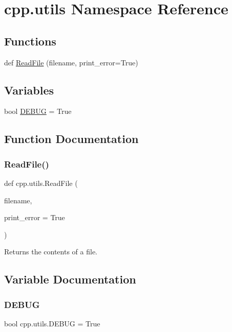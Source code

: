 \hypertarget{namespacecpp_1_1utils}{}\section{cpp.\+utils Namespace Reference}
\label{namespacecpp_1_1utils}
\subsection*{Functions}
\begin{DoxyCompactItemize}
\item 
def \mbox{\hyperlink{namespacecpp_1_1utils_a4258aa53673d101d6f57320ec9a3c3a2}{Read\+File}} (filename, print\+\_\+error=True)
\end{DoxyCompactItemize}
\subsection*{Variables}
\begin{DoxyCompactItemize}
\item 
bool \mbox{\hyperlink{namespacecpp_1_1utils_aa59cfd61e9b0495b717753e45fe9d201}{D\+E\+B\+UG}} = True
\end{DoxyCompactItemize}


\subsection{Function Documentation}
\mbox{\label{namespacecpp_1_1utils_a4258aa53673d101d6f57320ec9a3c3a2}} 
\subsubsection{\texorpdfstring{ReadFile()}{ReadFile()}}
{\footnotesize\ttfamily def cpp.\+utils.\+Read\+File (\begin{DoxyParamCaption}\item[{}]{filename,  }\item[{}]{print\+\_\+error = {\ttfamily True} }\end{DoxyParamCaption})}

\begin{DoxyVerb}Returns the contents of a file.\end{DoxyVerb}
 

\subsection{Variable Documentation}
\mbox{\label{namespacecpp_1_1utils_aa59cfd61e9b0495b717753e45fe9d201}} 
\subsubsection{\texorpdfstring{DEBUG}{DEBUG}}
{\footnotesize\ttfamily bool cpp.\+utils.\+D\+E\+B\+UG = True}

